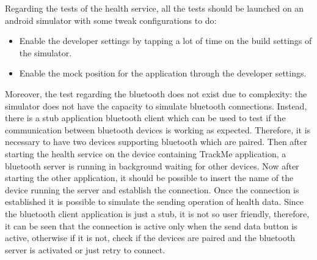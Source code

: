 Regarding the tests of the health service, all the tests should be launched on an android simulator with some tweak configurations to do:
\begin{itemize}
\item Enable the developer settings by tapping a lot of time on the build settings of the simulator.
\item Enable the mock position for the application through the developer settings.
\end{itemize}
Moreover, the test regarding the bluetooth does not exist due to complexity: the simulator does not have the capacity to simulate bluetooth connections. Instead, there is a stub application bluetooth client which can be used to test if the communication between bluetooth devices is working as expected. Therefore, it is necessary to have two devices supporting bluetooth which are paired. Then after starting the health service on the device containing TrackMe application, a bluetooth server is running in background waiting for other devices. Now after starting the other application, it should be possible to insert the name of the device running the server and establish the connection. Once the connection is established it is possible to simulate the sending operation of health data.
Since the bluetooth client application is just a stub, it is not so user friendly, therefore, it can be seen that the connection is active only when the send data button is active, otherwise if it is not, check if the devices are paired and the bluetooth server is activated or just retry to connect.


